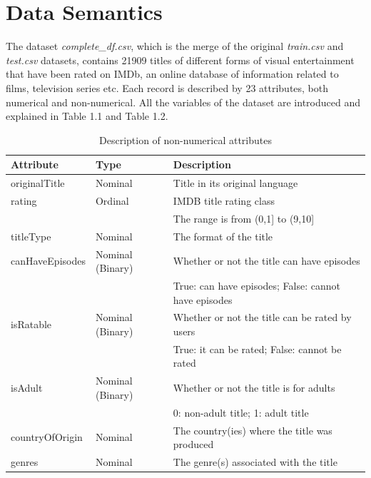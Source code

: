 \section{Data Semantics}\label{sec:data_semantics}
The dataset \textit{complete\_df.csv}, which is the merge of the original \textit{train.csv} and \textit{test.csv} datasets, contains 21909 titles of different forms of visual entertainment that have been rated on IMDb, an online database of information related to films, television series etc. 
Each record is described by 23 attributes, both numerical and non-numerical. 
All the variables of the dataset are introduced and explained in Table 1.1 and Table 1.2.
\begin{table}[h]
    \centering
    \begin{tabular}{|l|l|l|} %
        \hline
        \textbf{Attribute} & \textbf{Type} & \textbf{Description} \\ 
        \hline
        originalTitle & Nominal & Title in its original language \\  
        \hline
        rating & Ordinal & IMDB title rating class \\
        & & The range is from (0,1] to (9,10] \\ 
        \hline
        titleType & Nominal & The format of the title \\ 
        \hline
        canHaveEpisodes & Nominal (Binary) & Whether or not the title can have episodes \\ 
        & & True: can have episodes; False: cannot have episodes \\ 
        \hline
        isRatable & Nominal (Binary) & Whether or not the title can be rated by users \\ 
        & & True: it can be rated; False: cannot be rated \\ 
        \hline
        isAdult & Nominal (Binary) & Whether or not the title is for adults \\ 
        & & 0: non-adult title; 1: adult title \\ 
        \hline
        countryOfOrigin & Nominal & The country(ies) where the title was produced \\ 
        \hline
        genres & Nominal & The genre(s) associated with the title \\ 
        \hline
    \end{tabular}
    \caption{Description of non-numerical attributes}
    \label{tab:attributes}
\end{table}
